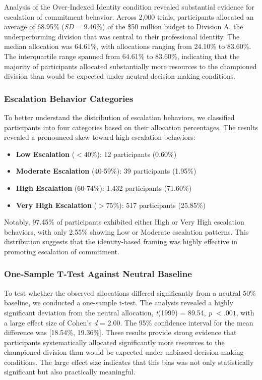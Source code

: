 \documentclass[letterpaper]{article} %
\begin{document}
Analysis of the Over-Indexed Identity condition revealed substantial evidence for escalation of commitment behavior. Across 2,000 trials, participants allocated an average of 68.95\% (\textit{SD} = 9.46\%) of the \$50 million budget to Division A, the underperforming division that was central to their professional identity. The median allocation was 64.61\%, with allocations ranging from 24.10\% to 83.60\%. The interquartile range spanned from 64.61\% to 83.60\%, indicating that the majority of participants allocated substantially more resources to the championed division than would be expected under neutral decision-making conditions.

\subsubsection{Escalation Behavior Categories}

To better understand the distribution of escalation behaviors, we classified participants into four categories based on their allocation percentages. The results revealed a pronounced skew toward high escalation behaviors:

\begin{itemize}
    \item \textbf{Low Escalation} ($<40\%$): 12 participants (0.60\%)
    \item \textbf{Moderate Escalation} (40-59\%): 39 participants (1.95\%)
    \item \textbf{High Escalation} (60-74\%): 1,432 participants (71.60\%)
    \item \textbf{Very High Escalation} ($>75\%$): 517 participants (25.85\%)
\end{itemize}

Notably, 97.45\% of participants exhibited either High or Very High escalation behaviors, with only 2.55\% showing Low or Moderate escalation patterns. This distribution suggests that the identity-based framing was highly effective in promoting escalation of commitment.

\subsubsection{One-Sample T-Test Against Neutral Baseline}

To test whether the observed allocations differed significantly from a neutral 50\% baseline, we conducted a one-sample t-test. The analysis revealed a highly significant deviation from the neutral allocation, \textit{t}(1999) = 89.54, \textit{p} $< .001$, with a large effect size of Cohen's \textit{d} = 2.00. The 95\% confidence interval for the mean difference was [18.54\%, 19.36\%]. These results provide strong evidence that participants systematically allocated significantly more resources to the championed division than would be expected under unbiased decision-making conditions. The large effect size indicates that this bias was not only statistically significant but also practically meaningful.
\end{document}
